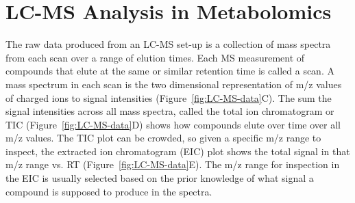 \section{LC-MS Analysis in Metabolomics}

The raw data produced from an LC-MS set-up is a collection of mass spectra from each scan over a range of elution times. Each MS measurement of compounds that elute at the same or similar retention time is called a scan. A mass spectrum in each scan is the two dimensional representation of m/z values of charged ions to signal intensities (Figure~\ref{fig:LC-MS-data}C). The sum the signal intensities across all mass spectra, called the total ion chromatogram or TIC (Figure~\ref{fig:LC-MS-data}D) shows how compounds elute over time over all m/z values. The TIC plot can be crowded, so given a specific m/z range to inspect, the extracted ion chromatogram (EIC) plot shows the total signal in that m/z range vs. RT (Figure~\ref{fig:LC-MS-data}E). The m/z range for inspection in the EIC is usually selected based on the prior knowledge of what signal a compound is supposed to produce in the spectra.

